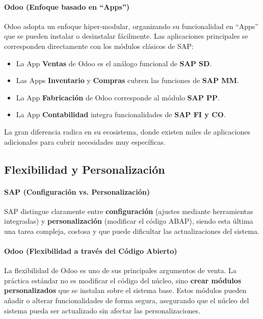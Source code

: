 \documentclass[12pt,letterpaper,spanish]{report}
\begin{document}
\paragraph{Odoo (Enfoque basado en ``Apps'')}
Odoo adopta un enfoque hiper-modular, organizando su funcionalidad en ``Apps'' que se pueden instalar o desinstalar fácilmente. Las aplicaciones principales se corresponden directamente con los módulos clásicos de SAP:
\begin{itemize}
    \item La App \textbf{Ventas} de Odoo es el análogo funcional de \textbf{SAP SD}.
    \item Las Apps \textbf{Inventario} y \textbf{Compras} cubren las funciones de \textbf{SAP MM}.
    \item La App \textbf{Fabricación} de Odoo corresponde al módulo \textbf{SAP PP}.
    \item La App \textbf{Contabilidad} integra funcionalidades de \textbf{SAP FI y CO}.
\end{itemize}
La gran diferencia radica en su ecosistema, donde existen miles de aplicaciones adicionales para cubrir necesidades muy específicas.

\subsection{Flexibilidad y Personalización}

\paragraph{SAP (Configuración vs. Personalización)}
SAP distingue claramente entre \textbf{configuración} (ajustes mediante herramientas integradas) y \textbf{personalización} (modificar el código ABAP), siendo esta última una tarea compleja, costosa y que puede dificultar las actualizaciones del sistema.

\paragraph{Odoo (Flexibilidad a través del Código Abierto)}
La flexibilidad de Odoo es uno de sus principales argumentos de venta. La práctica estándar no es modificar el código del núcleo, sino \textbf{crear módulos personalizados} que se instalan sobre el sistema base. Estos módulos pueden añadir o alterar funcionalidades de forma segura, asegurando que el núcleo del sistema pueda ser actualizado sin afectar las personalizaciones.
\end{document}
